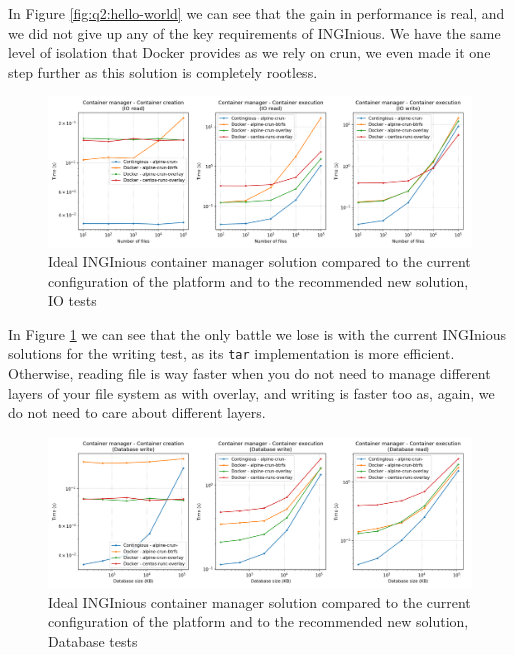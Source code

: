 In Figure \ref{fig:q2:hello-world} we can see that the gain in performance is real, and we did not give up any of the key requirements of INGInious.  We have the same level of isolation that Docker provides as we rely on crun, we even made it one step further as this solution is completely rootless.

\begin{figure}[h!]
  \begin{center}
    \includegraphics[width=\linewidth]{images/question-2-io.png}
    \caption{Ideal INGInious container manager solution compared to the current configuration of the platform and to the recommended new solution, IO tests}
    \label{fig:q2:io}
  \end{center}
\end{figure}

In Figure \ref{fig:q2:io} we can see that the only battle we lose is with the current INGInious solutions for the writing test, as its \texttt{tar} implementation is more efficient.  Otherwise, reading file is way faster when you do not need to manage different layers of your file system as with overlay, and writing is faster too as, again, we do not need to care about different layers.

\begin{figure}[h!]
  \begin{center}
    \includegraphics[width=\linewidth]{images/question-2-db.png}
    \caption{Ideal INGInious container manager solution compared to the current configuration of the platform and to the recommended new solution, Database tests}
    \label{fig:q2:db}
  \end{center}
\end{figure}

